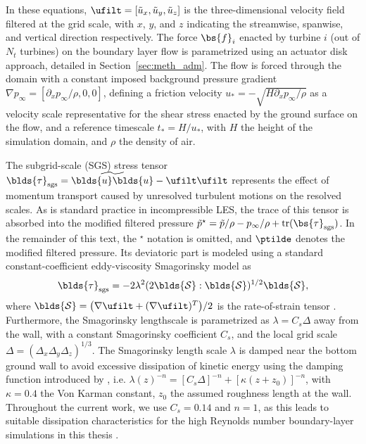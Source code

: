 In these equations, $\ufilt = [\tilde{u}_x, \tilde{u}_y, \tilde{u}_z]$ is the three-dimensional velocity field filtered at the grid scale, with $x$, $y$, and $z$ indicating the streamwise, spanwise, and vertical direction respectively. The force $\bs{f}_i$ enacted by turbine $i$ (out of $N_t$ turbines) on the boundary layer flow is parametrized using an actuator disk approach, detailed in Section~\ref{sec:meth_adm}. The flow is forced through the domain with a constant imposed background pressure gradient $\nabla p_\infty = [\partial_x p_\infty/\rho, 0, 0]$, defining a friction velocity $u_* = - \sqrt{H \partial_x p_\infty/\rho}$ as a velocity scale representative for the shear stress enacted by the ground surface on the flow, and a reference timescale $t_* = H/u_*$, with $H$ the height of the simulation domain, and $\rho$ the density of air. 

The subgrid-scale (SGS) stress tensor $\blds{\tau}_{\text{sgs}} = \widetilde{\blds{u} \blds{u}} - \ufilt \ufilt$ represents the effect of momentum transport caused by unresolved turbulent motions on the resolved scales. As is standard practice in incompressible LES, the trace of this tensor is absorbed into the modified filtered pressure $\tilde{p}^\star = \tilde{p}/\rho - p_\infty / \rho + \text{tr}(\bs{\tau}_\text{sgs})$. In the remainder of this text, the $^\star$ notation is omitted, and $\ptilde$ denotes the modified filtered pressure. Its deviatoric part is modeled using a standard constant-coefficient eddy-viscosity Smagorinsky model as 
\begin{equation}
	\blds{\tau}_{\text{sgs}} = - 2 \lambda^2 (2 \blds{\mathcal{S}} : \blds{\mathcal{S}})^{1/2} \blds{\mathcal{S}},
\end{equation}
where $\blds{\mathcal{S}} = \big(\nabla \ufilt + (\nabla \ufilt)^T \big)/2$ is the rate-of-strain tensor \citep{smagorinsky1963general}. Furthermore, the Smagorinsky lengthscale is parametrized as $\lambda = C_s \Delta$ away from the wall, with a constant Smagorinsky coefficient $C_s$, and the local grid scale $\Delta = (\Delta_x \Delta_y \Delta_z)^{1/3}$. The Smagorinsky length scale $\lambda$ is damped near the bottom ground wall to avoid excessive dissipation of kinetic energy using the damping function introduced by \cite{mason1992stochastic}, i.e. $\lambda(z)^{-n} = [C_s \Delta]^{-n} + [\kappa (z + z_0)]^{-n}$, with $\kappa = 0.4$ the Von Karman constant, $z_0$ the assumed roughness length at the wall. Throughout the current work, we use $C_s = 0.14$ and $n = 1$, as this leads to suitable dissipation characteristics for the high Reynolds number boundary-layer simulations in this thesis \citep{meyers2011error}.

